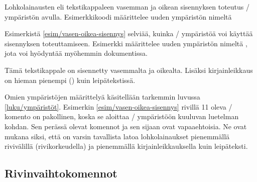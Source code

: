 \begin{esimerkki*}

\begin{koodilohko}
\newenvironment{lohkolainaus}{%
  \begin{list}{}{
      \setlength{\leftmargin}{1cm}
      \setlength{\rightmargin}{1cm}
      \setlength{\itemindent}{0bp}
      \setlength{\listparindent}{\parindent}
      \setlength{\parsep}{\parskip}
      \setlength{\topsep}{1em}
      \setlength{\partopsep}{0bp}
    }
  \item\linespread{1}\small
  }{\end{list}}
\end{koodilohko}
  \caption{Lohkolainausten eli tekstikappaleen vasemman ja oikean
    sisennyksen toteutus \-/ ympäristön avulla.
    Esimerkkikoodi määrittelee uuden ympäristön nimeltä
    }
  \label{esim/vasen-oikea-sisennys}
\end{esimerkki*}

Esimerkistä \ref{esim/vasen-oikea-sisennys} selviää, kuinka
\-/ ympäristöä voi käyttää sisennyksen toteuttamiseen.
Esimerkki määrittelee uuden ympäristön nimeltä
, jota voi hyödyntää myöhemmin dokumentissa.

\begin{koodilohkosis}
\begin{lohkolainaus}
  Tämä tekstikappale on sisennetty vasemmalta ja oikealta. Lisäksi
  kirjainleikkaus on hieman pienempi (\small) kuin leipätekstissä.
\end{lohkolainaus}
\end{koodilohkosis}

\noindent
Omien ympäristöjen määrittelyä käsitellään tarkemmin luvussa
\ref{luku/ympäristöt}. Esimerkin \ref{esim/vasen-oikea-sisennys} rivillä
11 oleva \-/ komento on pakollinen, koska se aloittaa
\-/ ympäristöön kuuluvan luetelman kohdan. Sen perässä
olevat komennot  ja  sen sijaan ovat
vapaaehtoisia. Ne ovat mukana siksi, että on varsin tavallista latoa
lohkolainaukset pienemmällä rivivälillä (rivikorkeudella) ja pienemmällä
kirjainleikkauksella kuin leipäteksti.

\subsection{Rivinvaihtokomennot}
\label{luku/rivinvaihtokomennot}

